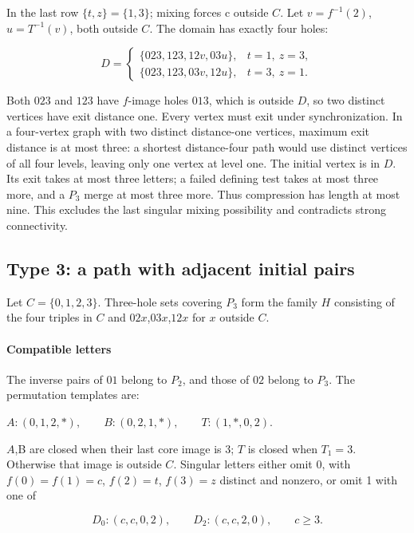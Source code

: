 \documentclass[11pt]{article}
\theoremstyle{definition}
\theoremstyle{plain}
\begin{document}
In the last row \(\{t,z\}=\{1,3\}\); mixing forces c outside \(C\).
Let \(v=f^{-1}(2)\), \(u=T^{-1}(v)\), both outside \(C\). The
domain has exactly four holes:

\[
D=\begin{cases}\{023,123,12v,03u\},&t=1,\ z=3,\\\{023,123,03v,12u\},&t=3,\ z=1.\end{cases}
\]

Both \(023\) and \(123\) have \(f\)-image
holes \(013\), which is outside \(D\), so two distinct vertices have exit
distance one. Every vertex must exit under synchronization. In a
four-vertex graph with two distinct distance-one vertices, maximum exit
distance is at most three: a shortest distance-four path would use
distinct vertices of all four levels, leaving only one vertex at level
one. The initial vertex is in \(D\). Its exit takes at most three
letters; a failed defining test takes at most three more, and a
\(P_{3}\) merge at most three more. Thus compression has length at most
nine. This excludes the last singular mixing possibility and contradicts
strong connectivity.

\subsection{Type 3: a path with adjacent initial pairs}\label{path-early-type-3-exclusion-at-codimension-three}

Let \(C=\{0,1,2,3\}\). Three-hole sets
covering \(P_{3}\) form the family \(H\) consisting of the four triples
in \(C\) and \(02x\),\(03x\),\(12x\) for \(x\) outside \(C\).

\paragraph{Compatible letters}\label{compatible-letters-1}

The inverse pairs of \(01\) belong to \(P_{2}\), and those
of \(02\) belong to \(P_{3}\). The permutation templates are:

\(A:(0,1,2,*),\qquad B:(0,2,1,*),\qquad T:(1,*,0,2).\)

\(A\),B are closed when their last core image is 3; \(T\) is closed when
\(T_{1}=3\). Otherwise that image is outside \(C\). Singular letters
either omit 0, with \(f(0)=f(1)=c\), \(f(2)=t\), \(f(3)=z\) distinct and
nonzero, or omit 1 with one of

\[
D_0:(c,c,0,2),\qquad D_2:(c,c,2,0),\qquad c\ge3.
\]
\end{document}
